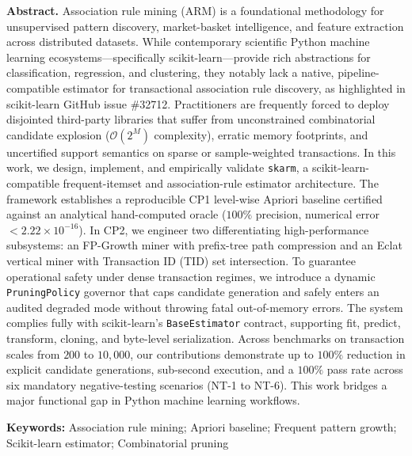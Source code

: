 \documentclass[11pt,a4paper]{article}
\begin{document}
\noindent \textbf{Abstract.} Association rule mining (ARM) is a foundational methodology for unsupervised pattern discovery, market-basket intelligence, and feature extraction across distributed datasets. While contemporary scientific Python machine learning ecosystems—specifically scikit-learn—provide rich abstractions for classification, regression, and clustering, they notably lack a native, pipeline-compatible estimator for transactional association rule discovery, as highlighted in scikit-learn GitHub issue \#32712. Practitioners are frequently forced to deploy disjointed third-party libraries that suffer from unconstrained combinatorial candidate explosion ($\mathcal{O}(2^M)$ complexity), erratic memory footprints, and uncertified support semantics on sparse or sample-weighted transactions. In this work, we design, implement, and empirically validate \texttt{skarm}, a scikit-learn-compatible frequent-itemset and association-rule estimator architecture. The framework establishes a reproducible CP1 level-wise Apriori baseline certified against an analytical hand-computed oracle ($100\%$ precision, numerical error $< 2.22 \times 10^{-16}$). In CP2, we engineer two differentiating high-performance subsystems: an FP-Growth miner with prefix-tree path compression and an Eclat vertical miner with Transaction ID (TID) set intersection. To guarantee operational safety under dense transaction regimes, we introduce a dynamic \texttt{PruningPolicy} governor that caps candidate generation and safely enters an audited degraded mode without throwing fatal out-of-memory errors. The system complies fully with scikit-learn's \texttt{BaseEstimator} contract, supporting fit, predict, transform, cloning, and byte-level serialization. Across benchmarks on transaction scales from $200$ to $10,000$, our contributions demonstrate up to $100\%$ reduction in explicit candidate generations, sub-second execution, and a $100\%$ pass rate across six mandatory negative-testing scenarios (NT-1 to NT-6). This work bridges a major functional gap in Python machine learning workflows.

\vspace{0.3em}
\noindent \textbf{Keywords:} Association rule mining; Apriori baseline; Frequent pattern growth; Scikit-learn estimator; Combinatorial pruning

\vspace{0.7em}
\end{document}
